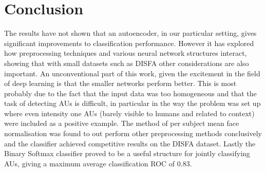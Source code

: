 \chapter{Conclusion}
  The results have not shown that an autoencoder, in our particular setting,
  gives significant improvements to classification performance. However it has
  explored how preprocessing techniques and various neural network structures
  interact, showing that with small datasets such as DISFA other considerations
  are also important. An unconventional part of this work, given the
  excitement in the field of deep learning is that the smaller networks
  perform better. This is most probably due to the fact that the input data
  was too homogeneous and that the task of detecting AUs is difficult, in
  particular in the way the problem was set up where even intensity one AUs
  (barely visible to humans and related to context) were included as a
  positive example. The method of per subject mean face normalisation was
  found to out perform other preprocessing methods conclusively and the
  classifier achieved competitive results on the DISFA dataset. Lastly the Binary Softmax
  classifier proved to be a useful structure for jointly classifying AUs, giving a maximum average classification ROC of 0.83.
